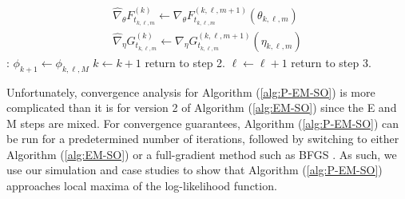 \begin{algorithm}
\begin{algorithmic}[1]
        \begin{gather}
            \widehat \nabla_\theta F_{t_{k,\ell,m}}^{(k)} \gets \nabla_\theta F_{t_{k,\ell,m}}^{(k,\ell,m+1)}(\theta_{k,\ell,m}) \\
            \widehat \nabla_\eta G_{t_{k,\ell,m}}^{(k)} \gets \nabla_\eta G_{t_{k,\ell,m}}^{(k,\ell,m+1)}(\eta_{k,\ell,m})
        \end{gather}
    \EndIf
\EndFor
%
\vspace{10pt}
%
:
    \State $\phi_{k+1} \gets \phi_{k,\ell,M}$
    \State $k \gets k+1$
    \State return to step 2.
\Else
    \State $\ell \gets \ell + 1$
    \State return to step 3.
\EndIf
%
\vspace{10pt}
%

\end{algorithmic}
\end{algorithm}



Unfortunately, convergence analysis for Algorithm (\ref{alg:P-EM-SO}) is more complicated than it is for version 2 of Algorithm (\ref{alg:EM-SO}) since the E and M steps are mixed. For convergence guarantees, Algorithm (\ref{alg:P-EM-SO}) can be run for a predetermined number of iterations, followed by switching to either Algorithm (\ref{alg:EM-SO}) or a full-gradient method such as BFGS \citep{Fletcher:2000}. As such, we use our simulation and case studies to show that Algorithm (\ref{alg:P-EM-SO}) approaches local maxima of the log-likelihood function.


